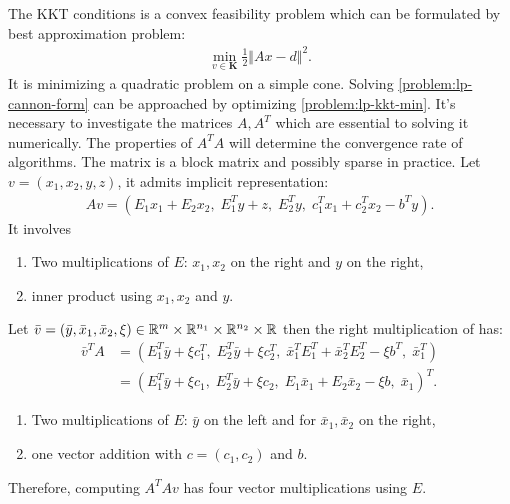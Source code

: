 \documentclass[12pt]{report}
\begin{document}
        The KKT conditions is a convex feasibility problem which can be formulated by best approximation problem: 
        \begin{align}\label{problem:lp-kkt-min}
            \min_{v \in \mathbf K} 
            \frac{1}{2}\Vert Ax - d \Vert^2. 
        \end{align}
        It is minimizing a quadratic problem on a simple cone. 
        Solving \eqref{problem:lp-cannon-form} can be approached by optimizing \eqref{problem:lp-kkt-min}. 
        It's necessary to investigate the matrices $A, A^T$ which are essential to solving it numerically. 
        The properties of $A^TA$ will determine the convergence rate of algorithms. 
        The matrix is a block matrix and possibly sparse in practice. 
        Let $v = (x_1, x_2, y, z)$, it admits implicit representation: 
        \begin{align*}
            Av = (E_1x_1 + E_2 x_2,\; E_1^Ty + z,\; E_2^Ty,\; c^T_1x_1 + c_2^Tx_2 - b^Ty). 
        \end{align*}
        It involves 
        \begin{enumerate}
            \item Two multiplications of $E$: $x_1, x_2$ on the right and $y$ on the right,  
            \item inner product using $x_1, x_2$ and $y$. 
        \end{enumerate}
        Let $\bar v = (\bar y, \bar x_1, \bar x_2, \xi) \in \mathbb R^m\times \mathbb R^{n_1} \times \mathbb R^{n_2}\times \mathbb R$ then the right multiplication of has: 
        \begin{align*}
            \bar v^TA  &= (
                E_1^T\bar y + \xi c_1^T,\; E_2^T\bar y + \xi c_2^T,\; 
                \bar x_1^TE_1^T + \bar x_2^TE_2^T - \xi b^T,\; \bar x_1^T
            )
            \\
            &= 
            (
                E_1^T\bar y + \xi c_1, \;
                E_2^T \bar y + \xi c_2, \;
                E_1\bar x_1 + E_2\bar x_2 - \xi b, \;
                \bar x_1
            )^T. 
        \end{align*}
        \begin{enumerate}
            \item Two multiplications of $E$: $\bar y$ on the left and for $\bar x_1, \bar x_2$ on the right, 
            \item one vector addition with $c = (c_1, c_2)$ and $b$. 
        \end{enumerate}
        Therefore, computing $A^TAv$ has four vector multiplications using $E$. 
\end{document}
